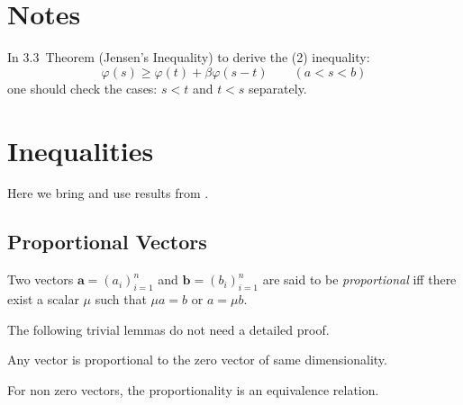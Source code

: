 


\section{Notes}

In 3.3~Theorem (Jensen's Inequality) to derive the (2) inequality:
\begin{equation*}
 \varphi(s) \geq \varphi(t) + \beta\varphi(s-t) \qquad (a<s<b)
\end{equation*}
one should check the cases: \(s<t\) and \(t<s\) separately.


\section{Inequalities}

Here we bring and use results from \cite{Hardy:1952:I}.

\subsection{Proportional Vectors}

Two vectors \(\mathbf{a} = (a_i)_{i=1}^n\)
and \(\mathbf{b} = (b_i)_{i=1}^n\) are said to be \emph{proportional}
iff there exist a scalar \(\mu\) such that
\(\mu a = b\)  or \( a = \mu b\).

The following trivial lemmas do not need a detailed proof.

\begin{lem}
Any vector is proportional to the zero vector of same dimensionality.
\end{lem}

\begin{lem}
For non zero vectors, the proportionality
is an equivalence relation.
\end{lem}


